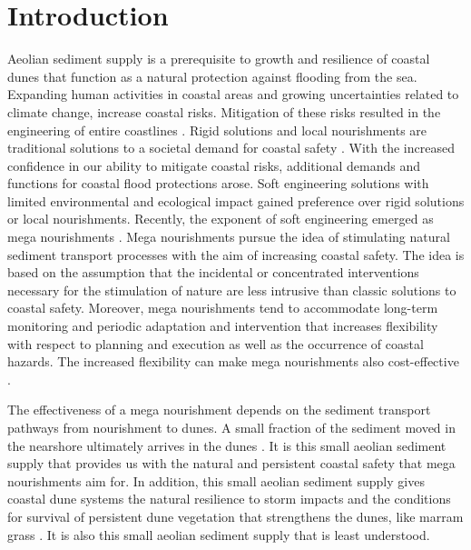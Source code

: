 \section{Introduction}

Aeolian sediment supply is a prerequisite to growth and resilience of
coastal dunes that function as a natural protection against flooding
from the sea. Expanding human activities in coastal areas and growing
uncertainties related to climate change, increase coastal
risks. Mitigation of these risks resulted in the engineering of entire
coastlines \citep{Donchyts2016}. Rigid solutions and local
nourishments are traditional solutions to a societal demand for
coastal safety \citep{Hamm2002}. With the increased confidence in our
ability to mitigate coastal risks, additional demands and functions
for coastal flood protections arose. Soft engineering solutions with
limited environmental and ecological impact \citep{Waterman2010,
  deVriend2015} gained preference over rigid solutions or local
nourishments. Recently, the exponent of soft engineering emerged as
mega nourishments \citep{Stive2013}.  Mega nourishments pursue the
idea of stimulating natural sediment transport processes with the aim
of increasing coastal safety. The idea is based on the assumption that
the incidental or concentrated interventions necessary for the
stimulation of nature are less intrusive than classic solutions to
coastal safety. Moreover, mega nourishments tend to accommodate
long-term monitoring and periodic adaptation and intervention that
increases flexibility with respect to planning and execution as well
as the occurrence of coastal hazards. The increased flexibility can
make mega nourishments also cost-effective \citep{vanSlobbe2013}.

The effectiveness of a mega nourishment depends on the sediment
transport pathways from nourishment to dunes. A small fraction of the
sediment moved in the nearshore ultimately arrives in the dunes
\citep{Aagaard2004}. It is this small aeolian sediment supply that
provides us with the natural and persistent coastal safety that mega
nourishments aim for. In addition, this small aeolian sediment supply
gives coastal dune systems the natural resilience to storm impacts and
the conditions for survival of persistent dune vegetation that
strengthens the dunes, like marram grass \citep{Borsje2011}. It is
also this small aeolian sediment supply that is least understood.

